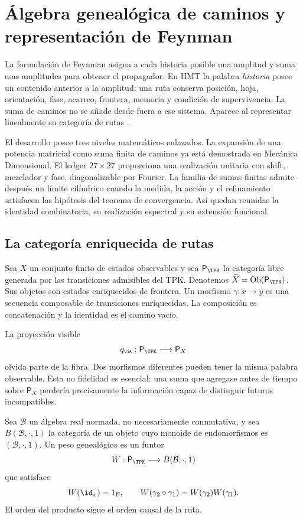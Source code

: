 \chapter{Álgebra genealógica de caminos y representación de Feynman}
\label{chap:integral-genealogica}

La formulación de Feynman asigna a cada historia posible una amplitud y suma
esas amplitudes para obtener el propagador. En HMT la palabra \emph{historia}
posee un contenido anterior a la amplitud: una ruta conserva posición, hoja,
orientación, fase, acarreo, frontera, memoria y condición de supervivencia. La
suma de caminos no se añade desde fuera a ese sistema. Aparece al representar
linealmente su categoría de rutas
\cite{Feynman1948,FeynmanHibbs1965}.

El desarrollo posee tres niveles matemáticos enlazados. La expansión de una
potencia matricial como suma finita de caminos ya está demostrada en Mecánica
Dimensional. El ledger \(27\times27\) proporciona una realización unitaria
con shift, mezclador y fase, diagonalizable por Fourier. La familia de sumas
finitas admite después un límite cilíndrico cuando la medida, la acción y el
refinamiento satisfacen las hipótesis del teorema de convergencia. Así quedan
reunidas la identidad combinatoria, su realización espectral y su extensión
funcional.

\section{La categoría enriquecida de rutas}

Sea \(X\) un conjunto finito de estados observables y sea
\(\mathsf P_{\TPK}\) la categoría libre generada por las transiciones
admisibles del TPK. Denotemos
\(\widetilde X=\operatorname{Ob}(\mathsf P_{\TPK})\). Sus objetos son estados
enriquecidos de frontera. Un morfismo
\(\gamma:\widetilde x\to\widetilde y\) es una secuencia composable de
transiciones enriquecidas.
La composición es concatenación y la identidad es el camino vacío.

La proyección visible
\[
 q_{\rm vis}:\mathsf P_{\TPK}\longrightarrow \mathsf P_X
\]
olvida parte de la fibra. Dos morfismos diferentes pueden tener la misma
palabra observable. Esta no fidelidad es esencial: una suma que agregase antes
de tiempo sobre \(\mathsf P_X\) perdería precisamente la información capaz de
distinguir futuros incompatibles.

\begin{definition}
Sea \(\mathcal B\) un álgebra real normada, no necesariamente conmutativa, y
sea \(B(\mathcal B,\cdot,1)\) la categoría de un objeto cuyo monoide de
endomorfismos es \((\mathcal B,\cdot,1)\). Un peso genealógico es un funtor
\[
 W:\mathsf P_{\TPK}\longrightarrow B(\mathcal B,\cdot,1)
\]
que satisface
\[
 W(\id_x)=1_{\mathcal B},\qquad
 W(\gamma_2\circ\gamma_1)=W(\gamma_2)W(\gamma_1).
\]
El orden del producto sigue el orden causal de la ruta.
\end{definition}

